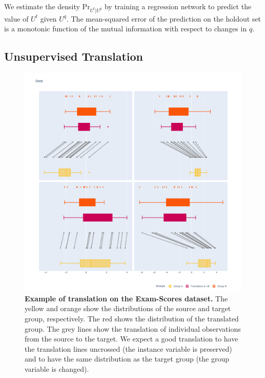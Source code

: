 \documentclass[nohyperref]{article}
\theoremstyle{plain}
\theoremstyle{definition}
\theoremstyle{remark}
\begin{document}
We estimate the density $\mathrm{Pr}_{U^t | U^q}$ by training a regression network to predict the value of $U^t$ given $U^q$. The mean-squared error of the prediction on the holdout set is a monotonic function of the mutual information with respect to changes in $q$.

\subsection{Unsupervised Translation}

\begin{figure}[ht]
    \vskip 0.2in
    \begin{center}
    \centerline{\includegraphics[width=\columnwidth]{files/data_trans.pdf}}
    \caption{\textbf{Example of translation on the Exam-Scores dataset.} The yellow and orange show the distributions of the source and target group, respectively. The red shows the distribution of the translated group. The grey lines show the translation of individual observations from the source to the target. We expect a good translation to have the translation lines uncrossed (the instance variable is preserved) and to have the same distribution as the target group (the group variable is changed).}
    \label{trans}
    \end{center}
    \vskip -0.2in
\end{figure}
\end{document}
